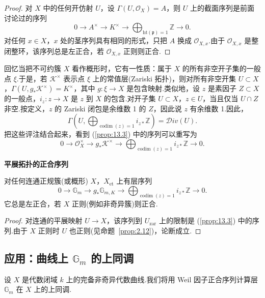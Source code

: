 \begin{proof}
对 $X$ 中的任何开仿射 $U$，设 $\Gamma(U, \mathcal{O}_X) = A$，则 $U$ 上的截面序列是前面讨论过的序列
\[
0 \to A^{\times} \to K^{\times} \to \bigoplus_{\mathrm{ht}(\mathfrak{p}) = 1} \mathbb{Z} \to 0.
\]
对任何 $x \in X$，$x$ 处的茎序列具有相同的形式，只把 $A$ 换成 $\mathcal{O}_{X, x}$.由于 $\mathcal{O}_{X, x}$ 是整闭整环，该序列总是左正合，若 $\mathcal{O}_{X, x}$ 正则则正合.
\end{proof}

回忆当把不可约簇 $X$ 看作概形时，它有一性质：属于 $X$ 的所有非空开子集的一般点 $\xi$.于是，若 $\mathcal{K}^{\times}$ 表示点 $\xi$ 上的常值层(Zariski 拓扑)，则对所有非空开集 $U \subset X$，$\Gamma(U, g_{*}\mathcal{K}^{\times}) = K^{\times}$，其中 $g \colon \xi \to X$ 是包含映射.类似地，设 $z$ 是素因子 $Z \subset X$ 的一般点，$i_z \colon z \to X$ 是 $z$ 到 $X$ 的包含.对开子集 $U \subset X$，$z \in U$，当且仅当 $U \cap Z$ 非空.按定义，$z$ 的 Zariski 闭包是余维数 1 的 $Z$，因此说 $z$ 有余维数 1.因此，
\[
\Gamma\left(U, \bigoplus_{\operatorname{codim}(z) = 1} i_{z*}\mathbb{Z}\right) = \mathcal{D}iv(U).
\]
把这些评注结合起来，看到 (\ref{prop:13.3}) 中的序列可以重写为
\[
0 \to \mathcal{O}^{\times}_{X} \to g_{*}\mathcal{K}^{\times} \to \bigoplus_{\operatorname{codim}(z) = 1} i_{z*}\mathbb{Z} \to 0.
\]

\textbf{平展拓扑的正合序列}

\begin{proposition}\label{prop:13.4}
对任何连通正规簇(或概形) $X$，$X_{\mathrm{et}}$ 上有层序列
\[
0 \to \mathbb{G}_{m} \to g_{*}\mathbb{G}_{m, K} \to \bigoplus_{\operatorname{codim}(z) = 1} i_{z*}\mathbb{Z} \to 0.
\]
它总是左正合，若 $X$ 正则(例如非奇异簇)则正合.
\end{proposition}

\begin{proof}
对连通的平展映射 $U \to X$，该序列到 $U_{\mathrm{zar}}$ 上的限制是 (\ref{prop:13.3}) 中的序列.由于 $X$ 正则时 $U$ 也正则(见命题~\ref{prop:2.12})，论断成立.
\end{proof}

\subsection*{\texorpdfstring{应用：曲线上 $\mathbb{G}_{m}$ 的上同调}{应用：曲线上 G\_m 的上同调}}

设 $X$ 是代数闭域 $k$ 上的完备非奇异代数曲线.我们将用 Weil 因子正合序列计算层 $\mathbb{G}_{m}$ 在 $X$ 上的上同调.

